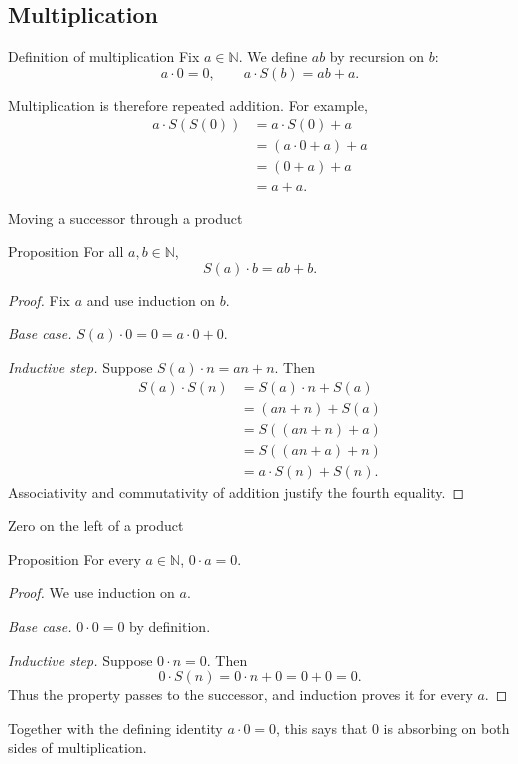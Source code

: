 \documentclass[aspectratio=169,11pt]{beamer}
\newcommand{\N}{\mathbb N}
\newcommand{\suc}[1]{S(#1)}
\begin{document}
\subsection{Multiplication}

\begin{frame}{Definition of multiplication}
  Fix \(a\in\N\).  We define \(ab\) by recursion on \(b\):
  \[
    \boxed{a\cdot0=0},
    \qquad
    \boxed{a\cdot\suc b=ab+a}.
  \]

  Multiplication is therefore repeated addition.  For example,
  \begin{align*}
    a\cdot\suc{\suc 0}
      &=a\cdot\suc 0+a\\
      &=(a\cdot0+a)+a\\
      &=(0+a)+a\\
      &=a+a.
  \end{align*}
\end{frame}

\begin{frame}{Moving a successor through a product}
  \footnotesize
  \begin{block}{Proposition}
    For all \(a,b\in\N\),
    \[
      \suc a\cdot b=ab+b.
    \]
  \end{block}

  \begin{proof}
    Fix \(a\) and use induction on \(b\).

    \emph{Base case.}
    \(\suc a\cdot0=0=a\cdot0+0\).

    \emph{Inductive step.} Suppose \(\suc a\cdot n=an+n\).  Then
    \begin{align*}
      \suc a\cdot\suc n
        &=\suc a\cdot n+\suc a\\
        &=(an+n)+\suc a\\
        &=\suc{(an+n)+a}\\
        &=\suc{(an+a)+n}\\
        &=a\cdot\suc n+\suc n.
    \end{align*}
    Associativity and commutativity of addition justify the fourth equality.
  \end{proof}
\end{frame}

\begin{frame}{Zero on the left of a product}
  \begin{block}{Proposition}
    For every \(a\in\N\), \(0\cdot a=0\).
  \end{block}

  \begin{proof}
    We use induction on \(a\).

    \emph{Base case.} \(0\cdot0=0\) by definition.

    \emph{Inductive step.} Suppose \(0\cdot n=0\).  Then
    \[
      0\cdot\suc n=0\cdot n+0=0+0=0.
    \]
    Thus the property passes to the successor, and induction proves it for
    every \(a\).
  \end{proof}

  Together with the defining identity \(a\cdot0=0\), this says that \(0\) is
  absorbing on both sides of multiplication.
\end{frame}
\end{document}
